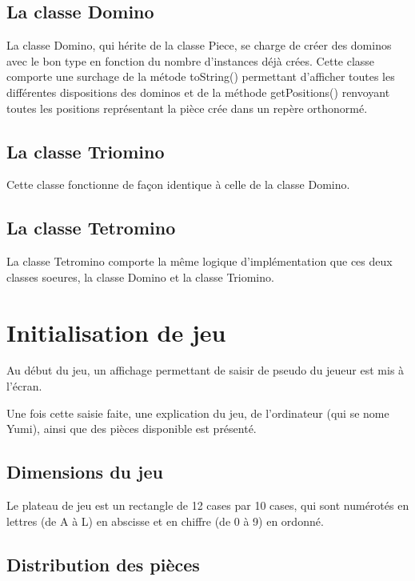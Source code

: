 \documentclass[a4paper, titlepage, french]{report}
\begin{document}
\section{La classe Domino}

La classe Domino, qui hérite de la classe Piece, se charge de créer des dominos avec le bon type 
en fonction du nombre d'instances déjà crées. Cette classe comporte une surchage de la métode toString()
permettant d'afficher toutes les différentes dispositions des dominos et de la méthode getPositions()
renvoyant toutes les positions représentant la pièce crée dans un repère orthonormé.

\bigskip

\section{La classe Triomino}

Cette classe fonctionne de façon identique à celle de la classe Domino.

\bigskip

\section{La classe Tetromino}

La classe Tetromino comporte la même logique d'implémentation que ces deux classes soeures, la classe Domino
et la classe Triomino.

\bigskip

\chapter{Initialisation de jeu}

Au début du jeu, un affichage permettant de saisir de pseudo du jeueur est mis à l'écran.

Une fois cette saisie faite, une explication du jeu, de l'ordinateur (qui se nome Yumi), ainsi que des pièces disponible est présenté.



\section{Dimensions du jeu}

Le plateau de jeu est un rectangle de 12 cases par 10 cases, qui sont numérotés en lettres (de A à L) en abscisse et en chiffre (de 0 à 9) en ordonné.

\section{Distribution des pièces}
\end{document}
